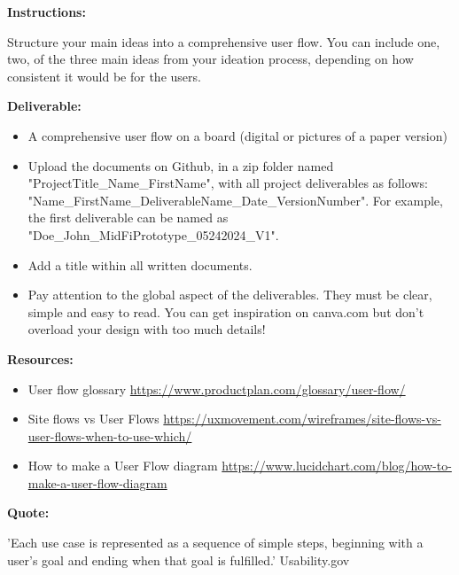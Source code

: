 \makeheaderfiles

\textbf{Instructions:}

Structure your main ideas into a comprehensive user flow.
You can include one, two, of the three main ideas from your ideation process, depending on how consistent it would be for the users.

\textbf{Deliverable:}

\begin{itemize}
\item A comprehensive user flow on a board (digital or pictures of a paper version)
\item Upload the documents on Github, in a zip folder named "ProjectTitle\_Name\_FirstName", with all project deliverables as follows: "Name\_FirstName\_DeliverableName\_Date\_VersionNumber".  For example, the first deliverable can be named as "Doe\_John\_MidFiPrototype\_05242024\_V1".
\item Add a title within all written documents.
\item Pay attention to the global aspect of the deliverables. They must be clear, simple and easy to read. You can get inspiration on canva.com but don't overload your design with too much details!
\end{itemize}

\textbf{Resources:}

\begin{itemize}
\item User flow glossary \url{https://www.productplan.com/glossary/user-flow/}
\item Site flows vs User Flows \url{https://uxmovement.com/wireframes/site-flows-vs-user-flows-when-to-use-which/}
\item How to make a User Flow diagram \url{https://www.lucidchart.com/blog/how-to-make-a-user-flow-diagram}
\end{itemize}

\textbf{Quote:}

'Each use case is represented as a sequence of simple steps, beginning with a user's goal and ending when that goal is fulfilled.' Usability.gov

